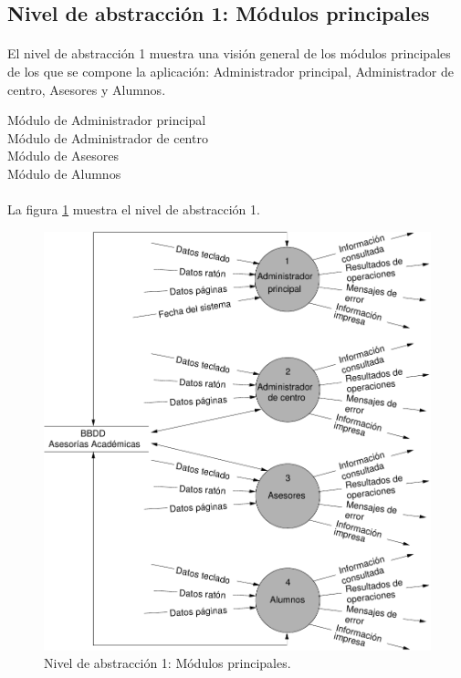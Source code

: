 \subsection{Nivel de abstracción 1: Módulos principales}

  \paragraph{}El nivel de abstracción 1 muestra una visión general de los
  módulos principales de los que se compone la aplicación: Administrador
  principal, Administrador de centro, Asesores y Alumnos.

  \begin{description}
   \item[Módulo de Administrador principal]
   \item[Módulo de Administrador de centro]
   \item[Módulo de Asesores]
   \item[Módulo de Alumnos]
  \end{description}

  \paragraph{}La figura \ref{diagramaNivel1} muestra el nivel de abstracción 1.

        \begin{figure}[!ht]
            \begin{center}
            \includegraphics[]{08.Analisis_Funcional/8.2.DFDs/Niveles/Diagramas/nivel1.pdf}
            \caption{Nivel de abstracción 1: Módulos principales.}
            \label{diagramaNivel1}
            \end{center}
         \end{figure}